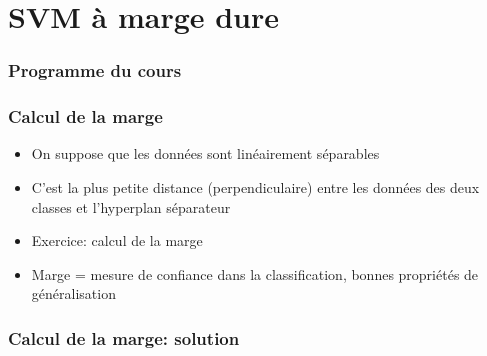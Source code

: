 \documentclass[9pt,table]{beamer} %
\begin{document}
\section{SVM à marge dure}

\begin{frame}
\frametitle{Programme du cours}
\tableofcontents[currentsection]
\end{frame}


\begin{frame}
\frametitle{Calcul de la marge}

\begin{itemize}[label=\tiny$\blacksquare$]
	\item On suppose que les données sont linéairement séparables

	\item
	\begin{defn}[Marge]
		C'est la plus petite distance (perpendiculaire) entre les données des deux classes et l'hyperplan séparateur
	\end{defn}

	\myfig{
		
	}
	
	\item Exercice: calcul de la marge
	
	\item Marge = mesure de confiance dans la classification, bonnes propriétés de généralisation
	
\end{itemize}
\end{frame}

\begin{frame}
\frametitle{Calcul de la marge: solution}


	\myfig{
		
	}
	
\end{frame}
\end{document}
